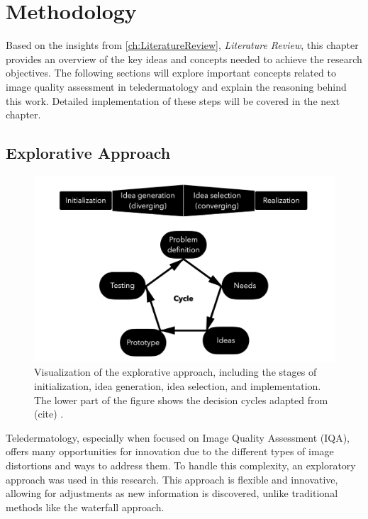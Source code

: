 \chapter{Methodology}
\label{ch:Methodology}
Based on the insights from \autoref{ch:LiteratureReview}, \textit{Literature Review}, this chapter provides an overview of the key ideas and concepts needed to achieve the research objectives. The following sections will explore important concepts related to image quality assessment in teledermatology and explain the reasoning behind this work. Detailed implementation of these steps will be covered in the next chapter.\par

\section{Explorative Approach}
\label{sec:ExplorativeApproach}
\begin{figure}[ht]
    \centering
    \includegraphics[keepaspectratio,width=13cm]{img/DecisionCycle.jpg}
    \caption{Visualization of the explorative approach, including the stages of initialization, idea generation, idea selection, and implementation. The lower part of the figure shows the decision cycles adapted from (cite) \autocite{DesignThinking}.}
    \label{fig:decision_cycle}
\end{figure}
\noindent
Teledermatology, especially when focused on Image Quality Assessment (IQA), offers many opportunities for innovation due to the different types of image distortions and ways to address them. To handle this complexity, an exploratory approach was used in this research. This approach is flexible and innovative, allowing for adjustments as new information is discovered, unlike traditional methods like the waterfall approach. \par
